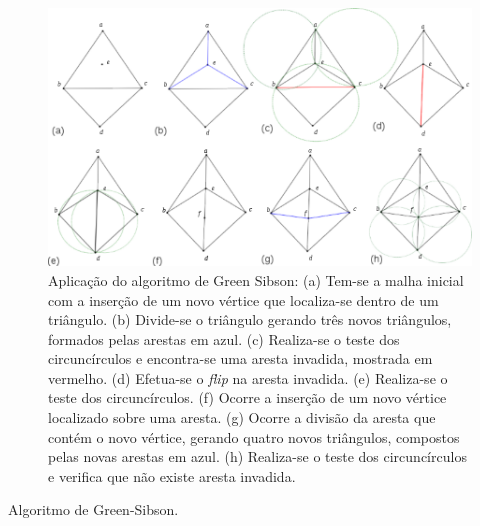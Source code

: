 \begin{figure}[!ht]
  \centering
  \includegraphics[width=350pt]{imagens_delaunay/green_sibson.png}
  \caption{\footnotesize{Aplicação do algoritmo de Green Sibson: (a) Tem-se a malha inicial com a inserção de um novo vértice que localiza-se dentro de um triângulo. (b) Divide-se o triângulo gerando três novos triângulos, formados pelas arestas em azul. (c) Realiza-se o teste dos circuncírculos e encontra-se uma aresta invadida, mostrada em vermelho. (d) Efetua-se o {\it flip} na aresta invadida. (e) Realiza-se o teste dos circuncírculos. (f) Ocorre a inserção de um novo vértice localizado sobre uma aresta. (g) Ocorre a divisão da aresta que contém o novo vértice, gerando quatro novos triângulos, compostos pelas novas arestas em azul. (h) Realiza-se o teste dos circuncírculos e verifica que não existe aresta invadida.
}}
  \label{fig_green_sibson}
\end{figure}

\begin{algorithm}[!ht]
\caption{Algoritmo de Green-Sibson.} 
\label{algoritmo_green_sibson}
\end{algorithm} 

